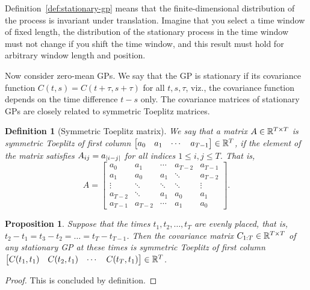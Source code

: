 \documentclass[]{article}
\newtheorem{proposition}[theorem]{Proposition}
\newtheorem{definition}[theorem]{Definition}
\begin{document}
Definition~\ref{def:stationary-gp} means that the finite-dimensional distribution of the process is invariant under translation. Imagine that you select a time window of fixed length, the distribution of the stationary process in the time window must not change if you shift the time window, and this result must hold for arbitrary window length and position.

Now consider zero-mean GPs. We say that the GP is stationary if its covariance function $C(t,s) = C(t+\tau, s+\tau)$ for all $t,s,\tau$, viz., the covariance function depends on the time difference $t-s$ only. The covariance matrices of stationary GPs are closely related to symmetric Toeplitz matrices.


\begin{definition}[Symmetric Toeplitz matrix]
	We say that a matrix $A\in\mathbb{R}^{T \times T}$ is symmetric Toeplitz of first column $\begin{bmatrix} a_0 & a_1 & \cdots & a_{T-1} \end{bmatrix} \in\mathbb{R}^T$, if the element of the matrix satisfies $A_{ij} = a_{\lvert i-j\rvert}$ for all indices $1\leq i,j\leq T$. That is,
	\begin{equation*}
		A = 
		\begin{bmatrix}
			a_0 & a_1 & \cdots & a_{T-2} & a_{T-1} \\
			a_1 & a_0 & a_1 & \ddots & a_{T-2} \\
			\vdots & \ddots & \ddots & \ddots & \vdots \\
			a_{T-2} & \ddots & a_1 & a_0 & a_1 \\
			a_{T-1} & a_{T-2} & \cdots & a_1 & a_0
		\end{bmatrix}.
	\end{equation*}
\end{definition}

\begin{proposition}
	\label{prop:cov-fisrt-col}
	Suppose that the times $t_1, t_2, \ldots, t_T$ are evenly placed, that is, $t_2 - t_1 = t_3 - t_2 = \ldots = t_T - t_{T-1}$. Then the covariance matrix $C_{1:T}\in\mathbb{R}^{T\times T}$ of any stationary GP at these times is symmetric Toeplitz of first column $\begin{bmatrix} C(t_1, t_1) & C(t_2, t_1) & \cdots & C(t_{T}, t_1) \end{bmatrix} \in\mathbb{R}^T$.
\end{proposition}
\begin{proof}
	This is concluded by definition.
\end{proof}
\end{document}
